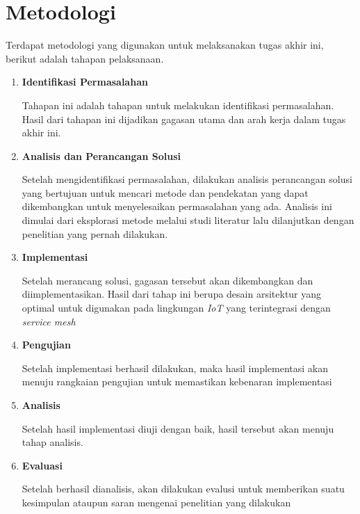 \section{Metodologi}

Terdapat metodologi yang digunakan untuk melaksanakan tugas akhir ini, berikut adalah tahapan pelaksanaan.
\begin{enumerate}
  \item \textbf{Identifikasi Permasalahan}

        Tahapan ini adalah tahapan untuk melakukan identifikasi permasalahan. Hasil dari tahapan ini dijadikan gagasan utama dan arah kerja dalam tugas akhir ini.

  \item \textbf{Analisis dan Perancangan Solusi}

        Setelah mengidentifikasi permasalahan, dilakukan analisis perancangan solusi yang bertujuan untuk mencari metode dan pendekatan yang dapat dikembangkan untuk menyelesaikan permasalahan yang ada. Analisis ini dimulai dari eksplorasi metode melalui studi literatur lalu dilanjutkan dengan penelitian yang pernah dilakukan.

  \item \textbf{Implementasi}

        Setelah merancang solusi, gagasan tersebut akan dikembangkan dan diimplementasikan. Hasil dari tahap ini berupa desain arsitektur yang optimal untuk digunakan pada lingkungan \textit{IoT} yang terintegrasi dengan \textit{service mesh}

  \item \textbf{Pengujian}

        Setelah implementasi berhasil dilakukan, maka hasil implementasi akan menuju rangkaian pengujian untuk memastikan kebenaran implementasi

  \item \textbf{Analisis}

        Setelah hasil implementasi diuji dengan baik, hasil tersebut akan menuju tahap analisis.

  \item \textbf{Evaluasi}

        Setelah berhasil dianalisis, akan dilakukan evalusi untuk memberikan suatu kesimpulan ataupun saran mengenai penelitian yang dilakukan
\end{enumerate}